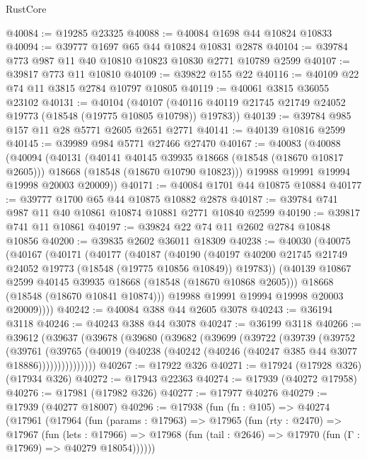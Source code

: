 \begin{lexlean}{RustCore}
\begin{coremodule}
@40084 := @19285 @23325
@40088 := @40084 @1698 @44 @10824 @10833
@40094 := @39777 @1697 @65 @44 @10824 @10831 @2878
@40104 := @39784 @773 @987 @11 @40 @10810 @10823 @10830 @2771 @10789 @2599
@40107 := @39817 @773 @11 @10810
@40109 := @39822 @155 @22
@40116 := @40109 @22 @74 @11 @3815 @2784 @10797 @10805
@40119 := @40061 @3815 @36055 @23102
@40131 := @40104
    (@40107 (@40116 @40119 @21745 @21749 @24052 @19773 (@18548 (@19775 @10805 @10798)) @19783))
@40139 := @39784 @985 @157 @11 @28 @5771 @2605 @2651 @2771
@40141 := @40139 @10816 @2599
@40145 := @39989 @984 @5771 @27466 @27470
@40167 := @40083
    (@40088
      (@40094
        (@40131
          (@40141 @40145 @39935 @18668 (@18548 (@18670 @10817 @2605)))
          @18668
          (@18548 (@18670 @10790 @10823)))
        @19988
        @19991
        @19994
        @19998
        @20003
        @20009))
@40171 := @40084 @1701 @44 @10875 @10884
@40177 := @39777 @1700 @65 @44 @10875 @10882 @2878
@40187 := @39784 @741 @987 @11 @40 @10861 @10874 @10881 @2771 @10840 @2599
@40190 := @39817 @741 @11 @10861
@40197 := @39824 @22 @74 @11 @2602 @2784 @10848 @10856
@40200 := @39835 @2602 @36011 @18309
@40238 := @40030
    (@40075
      (@40167
        (@40171
          (@40177
            (@40187
              (@40190
                (@40197 @40200 @21745 @21749 @24052 @19773 (@18548 (@19775 @10856 @10849)) @19783))
              (@40139 @10867 @2599 @40145 @39935 @18668 (@18548 (@18670 @10868 @2605)))
              @18668
              (@18548 (@18670 @10841 @10874)))
            @19988
            @19991
            @19994
            @19998
            @20003
            @20009))))
@40242 := @40084 @388 @44 @2605 @3078
@40243 := @36194 @3118
@40246 := @40243 @388 @44 @3078
@40247 := @36199 @3118
@40266 := @39612
    (@39637
      (@39678
        (@39680
          (@39682
            (@39699
              (@39722
                (@39739
                  (@39752
                    (@39761
                      (@39765
                        (@40019 (@40238 (@40242 (@40246 (@40247 @385 @44 @3077 @18886)))))))))))))))
@40267 := @17922 @326
@40271 := @17924 (@17928 @326) (@17934 @326)
@40272 := @17943 @22363
@40274 := @17939 (@40272 @17958)
@40276 := @17981 (@17982 @326)
@40277 := @17977 @40276
@40279 := @17939 (@40277 @18007)
@40296 := @17938
    (fun (fn : @105) =>
    @40274
      (@17961
        (@17964
          (fun (params : @17963) =>
          @17965
            (fun (rty : @2470) =>
            @17967
              (fun (lets : @17966) =>
              @17968 (fun (tail : @2646) => @17970 (fun (Γ : @17969) => @40279 @18054))))))

\end{coremodule}
\end{lexlean}
